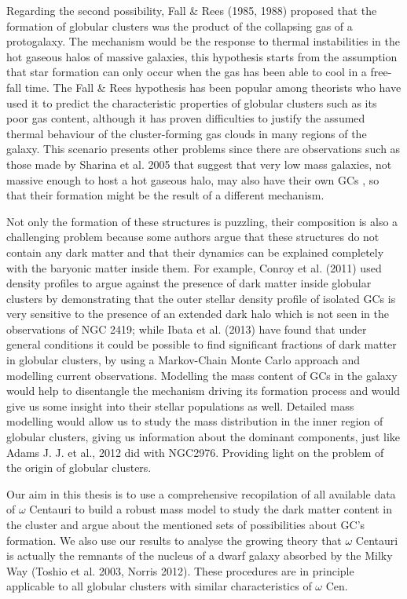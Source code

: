 Regarding the second possibility, Fall \& Rees (1985, 1988) proposed that the formation of globular clusters was the product of the collapsing gas of a protogalaxy. The mechanism would be the response to thermal instabilities in the hot gaseous halos of massive galaxies, this hypothesis starts from the assumption that star formation can only occur when the gas has been able to cool in a free-fall time. The Fall \& Rees hypothesis has been popular among theorists who have used it to predict the characteristic properties of globular clusters such as its poor gas content, although it has proven difficulties to justify the assumed thermal behaviour of the cluster-forming gas clouds in many regions of the galaxy. This scenario presents other problems since there are observations such as those made by Sharina et al. 2005 that suggest that very low mass galaxies, not massive enough to host a hot gaseous halo, may also have their own GCs , so that their formation might be the result of a different mechanism.

Not only the formation of these structures is puzzling, their composition is also a challenging problem because some authors argue that these structures do not contain any dark matter and that their dynamics can be explained completely with the baryonic matter inside them. For example, Conroy et al. (2011) used density profiles to argue against the presence of dark matter inside globular clusters by demonstrating that the outer stellar density profile of isolated GCs is
very sensitive to the presence of an extended dark halo which is not seen in the observations of NGC 2419; while Ibata et al. (2013) have found that under general conditions it could be possible to find significant fractions of dark matter in globular clusters, by using a Markov-Chain Monte Carlo approach and modelling current observations. Modelling the mass content of GCs in the galaxy would help to disentangle the mechanism driving its formation process and would give us some insight into their stellar populations as well. Detailed mass modelling would allow us to study the mass distribution in the inner region of globular clusters, giving us information about the dominant components, just like Adams J. J. et al., 2012 did with NGC2976. Providing light on the problem of the origin of globular clusters.

Our aim in this thesis is to use a comprehensive recopilation of all available data of $\omega$ Centauri to build a robust mass model to study the dark matter content in the cluster and argue about the mentioned sets of possibilities about GC's formation. We also use our results to analyse the growing theory that $\omega$ Centauri is actually the remnants of the nucleus of a dwarf galaxy absorbed by the Milky Way (Toshio et al. 2003, Norris 2012). These procedures are in principle applicable to all globular clusters with similar characteristics of $\omega$ Cen. 

